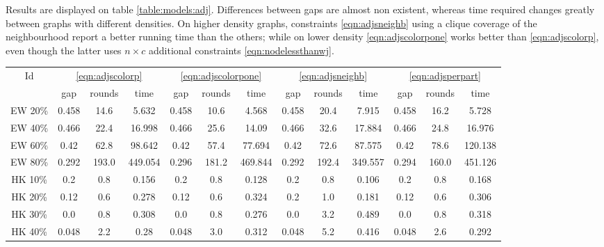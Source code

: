 Results are displayed on table \ref{table:models:adj}. Differences between gaps are almost non existent, whereas time required changes greatly between graphs with different densities. On higher density graphs, constraints \ref{eqn:adjsneighb} using a clique coverage of the neighbourhood report a better running time than the others; while on lower density \ref{eqn:adjscolorpone} works better than \ref{eqn:adjscolorp}, even though the latter uses $n \times c$ additional constraints \ref{eqn:nodelessthanwj}.

\begin{sidewaystable}
\label{table:models:adj}
\centering

	\begin{tabular}{|c|ccc|ccc|ccc|ccc|}
	\hline
	\multicolumn{1}{|c|}{Id} & \multicolumn{3}{|c|}{\ref{eqn:adjscolorp}} & \multicolumn{3}{|c|}{\ref{eqn:adjscolorpone}} & \multicolumn{3}{|c|}{\ref{eqn:adjsneighb}} & \multicolumn{3}{|c|}{\ref{eqn:adjsperpart}} 
	\\
	& gap & rounds & time & gap & rounds & time & gap & rounds & time & gap & rounds & time 
	\\
	\hline
	EW 20\% & 0.458 & 14.6 & 5.632 & 0.458 & 10.6 & 4.568 & 0.458 & 20.4 & 7.915 & 0.458 & 16.2 & 5.728
	\\
	EW 40\% & 0.466 & 22.4 & 16.998 & 0.466 & 25.6 & 14.09 & 0.466 & 32.6 & 17.884 & 0.466 & 24.8 & 16.976
	\\
	EW 60\% & 0.42 & 62.8 & 98.642 & 0.42 & 57.4 & 77.694 & 0.42 & 72.6 & 87.575 & 0.42 & 78.6 & 120.138
	\\
	EW 80\% & 0.292 & 193.0 & 449.054 & 0.296 & 181.2 & 469.844 & 0.292 & 192.4 & 349.557 & 0.294 & 160.0 & 451.126
	\\
	\hline
	HK 10\% &  0.2 &  0.8 & 0.156 &  0.2 &  0.8 & 0.128 &  0.2 &  0.8 & 0.106 &  0.2 &  0.8 & 0.168
	\\
	HK 20\% & 0.12 &  0.6 & 0.278 & 0.12 &  0.6 & 0.324 &  0.2 &  1.0 & 0.181 & 0.12 &  0.6 & 0.306
	\\
	HK 30\% &  0.0 &  0.8 & 0.308 &  0.0 &  0.8 & 0.276 &  0.0 &  3.2 & 0.489 &  0.0 &  0.8 & 0.318
	\\
	HK 40\% & 0.048 &  2.2 & 0.28 & 0.048 &  3.0 & 0.312 & 0.048 &  5.2 & 0.416 & 0.048 &  2.6 & 0.292
	\\
	\hline 
	 \end{tabular}
	
	\caption{Comparison of different color conflict constraints on the model formulation: adjacent nodes sum bounded by $w_j$ (\ref{eqn:adjscolorp}), adjacent nodes sum bounded by $1$ (\ref{eqn:adjscolorpone}), adjacencies grouped by partition (\ref{eqn:adjsperpart}) and using clique coverage of the neighbourhood (\ref{eqn:adjsneighb}).}
\end{sidewaystable}

